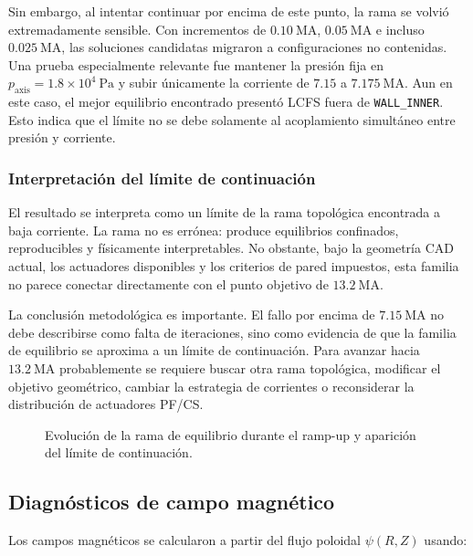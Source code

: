 \documentclass[11pt,a4paper]{article}
\begin{document}
Sin embargo, al intentar continuar por encima de este punto, la rama se volvió extremadamente
sensible. Con incrementos de $0.10~\mathrm{MA}$, $0.05~\mathrm{MA}$ e incluso $0.025~\mathrm{MA}$,
las soluciones candidatas migraron a configuraciones no contenidas. Una prueba especialmente
relevante fue mantener la presión fija en $p_{\mathrm{axis}}=1.8\times10^4~\mathrm{Pa}$ y subir
únicamente la corriente de $7.15$ a $7.175~\mathrm{MA}$. Aun en este caso, el mejor equilibrio
encontrado presentó LCFS fuera de \texttt{WALL\_INNER}. Esto indica que el límite no se debe
solamente al acoplamiento simultáneo entre presión y corriente.

\subsubsection{Interpretación del límite de continuación}
El resultado se interpreta como un límite de la rama topológica encontrada a baja corriente.
La rama no es errónea: produce equilibrios confinados, reproducibles y físicamente interpretables.
No obstante, bajo la geometría CAD actual, los actuadores disponibles y los criterios de pared
impuestos, esta familia no parece conectar directamente con el punto objetivo de
$13.2~\mathrm{MA}$.

La conclusión metodológica es importante. El fallo por encima de $7.15~\mathrm{MA}$ no debe
describirse como falta de iteraciones, sino como evidencia de que la familia de equilibrio se
aproxima a un límite de continuación. Para avanzar hacia $13.2~\mathrm{MA}$ probablemente se
requiere buscar otra rama topológica, modificar el objetivo geométrico, cambiar la estrategia
de corrientes o reconsiderar la distribución de actuadores PF/CS.

\begin{figure}[htbp]
\centering
{}
\caption{Evolución de la rama de equilibrio durante el ramp-up y aparición del límite de continuación.}
\label{fig:rampup_branch_limit_placeholder}
\end{figure}

\subsection{Diagnósticos de campo magnético}
Los campos magnéticos se calcularon a partir del flujo poloidal $\psi(R,Z)$ usando:
\end{document}
